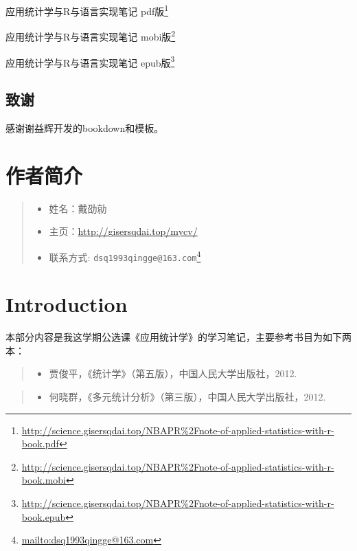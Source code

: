\documentclass[]{ctexbook}
\providecommand{\tightlist}{%
  \setlength{\itemsep}{0pt}\setlength{\parskip}{0pt}}
\renewcommand{\href}[2]{#2\footnote{\url{#1}}}
\begin{document}
\href{http://science.gisersqdai.top/NBAPR\%2Fnote-of-applied-statistics-with-r-book.pdf}{应用统计学与R与语言实现笔记 pdf版}

\href{http://science.gisersqdai.top/NBAPR\%2Fnote-of-applied-statistics-with-r-book.mobi}{应用统计学与R与语言实现笔记 mobi版}

\href{http://science.gisersqdai.top/NBAPR\%2Fnote-of-applied-statistics-with-r-book.epub}{应用统计学与R与语言实现笔记 epub版}

\hypertarget{ux81f4ux8c22}{%
\section*{致谢}\label{ux81f4ux8c22}}


感谢谢益辉开发的bookdown和模板。

\hypertarget{author}{%
\chapter*{作者简介}\label{author}}


\begin{quote}
\begin{itemize}
\tightlist
\item
  姓名：戴劭勍
\item
  主页：\url{http://gisersqdai.top/mycv/}
\item
  联系方式: \href{mailto:dsq1993qingge@163.com}{\nolinkurl{dsq1993qingge@163.com}}
\end{itemize}
\end{quote}

\mainmatter

\hypertarget{intro}{%
\chapter{Introduction}\label{intro}}

本部分内容是我这学期公选课《应用统计学》的学习笔记，主要参考书目为如下两本：

\begin{quote}
\begin{itemize}
\tightlist
\item
  贾俊平，《统计学》（第五版），中国人民大学出版社，2012.
\end{itemize}
\end{quote}

\begin{quote}
\begin{itemize}
\tightlist
\item
  何晓群，《多元统计分析》（第三版），中国人民大学出版社，2012.
\end{itemize}
\end{quote}
\end{document}
